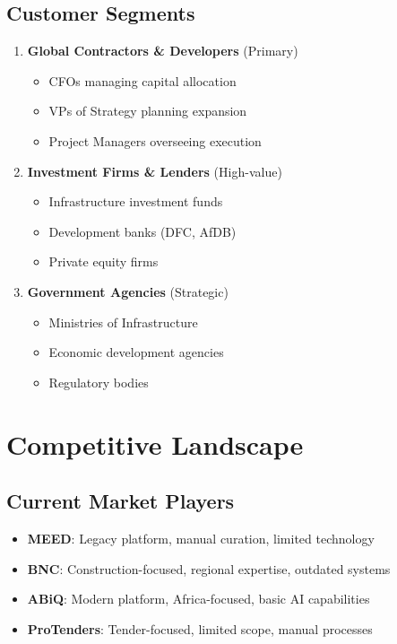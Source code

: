 \documentclass[business]{../templates/infraradar-main}
\begin{document}
\subsection{Customer Segments}
\begin{enumerate}
    \item \textbf{Global Contractors \& Developers} (Primary)
    \begin{itemize}
        \item CFOs managing capital allocation
        \item VPs of Strategy planning expansion
        \item Project Managers overseeing execution
    \end{itemize}
    \item \textbf{Investment Firms \& Lenders} (High-value)
    \begin{itemize}
        \item Infrastructure investment funds
        \item Development banks (DFC, AfDB)
        \item Private equity firms
    \end{itemize}
    \item \textbf{Government Agencies} (Strategic)
    \begin{itemize}
        \item Ministries of Infrastructure
        \item Economic development agencies
        \item Regulatory bodies
    \end{itemize}
\end{enumerate}

\section{Competitive Landscape}

\subsection{Current Market Players}
\begin{itemize}
    \item \textbf{MEED}: Legacy platform, manual curation, limited technology
    \item \textbf{BNC}: Construction-focused, regional expertise, outdated systems
    \item \textbf{ABiQ}: Modern platform, Africa-focused, basic AI capabilities
    \item \textbf{ProTenders}: Tender-focused, limited scope, manual processes
\end{itemize}
\end{document}
